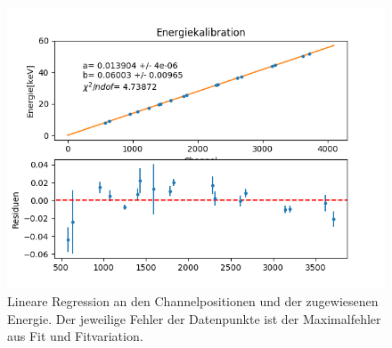 \documentclass[12pt,a4paper]{article}
\begin{document}
\begin{figure}
\centering
\includegraphics[scale=0.8]{Bilder/alpha/kal.png}
\caption{Lineare Regression an den Channelpositionen und der zugewiesenen Energie. Der jeweilige Fehler der Datenpunkte ist der Maximalfehler aus Fit und Fitvariation.}
\label{fig:kal_linreg}
\end{figure}


\newpage
\end{document}
